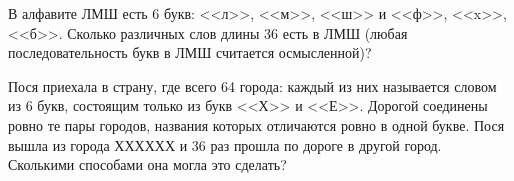 \begin{problems}
\item В алфавите ЛМШ есть 6 букв: <<л>>, <<м>>, <<ш>> и <<ф>>, <<x>>, <<б>>. Сколько различных слов длины 36 есть в ЛМШ (любая последовательность букв в ЛМШ считается осмысленной)? %

\item Пося приехала в страну, где всего 64 города: каждый из них называется словом из 6 букв, состоящим только из букв <<Х>> и <<Е>>. Дорогой соединены ровно те пары городов, названия которых отличаются ровно в одной букве. Пося вышла из города ХХХХХХ и 36 раз прошла по дороге в другой город. Сколькими способами она могла это сделать? %


\end{problems}